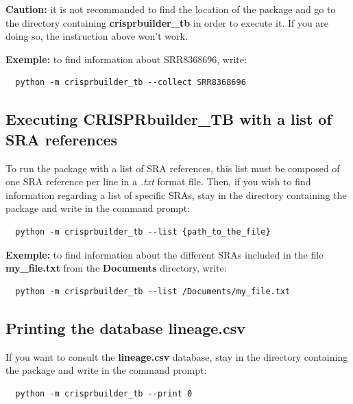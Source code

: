 \documentclass[twoside,a4paper,11pt,frenchb,openany]{report}
\begin{document}
\textbf{Caution:} it is not recommanded to find the location of the
package and go to the directory containing \textbf{crisprbuilder\_tb} in order to
execute it. If you are doing so, the instruction above won't work.

    \textbf{Exemple:} to find information about SRR8368696, write:

    \begin{verbatim}
  python -m crisprbuilder_tb --collect SRR8368696
\end{verbatim}


    \subsection{Executing CRISPRbuilder\_TB with a list of SRA
references}\label{executing-crisprbuilder_tb-with-a-list-of-sra-references}

    To run the package with a list of SRA references, this list must be
composed of one SRA reference per line in a \textit{.txt} format file. Then, if
you wish to find information regarding a list of specific SRAs, stay in
the directory containing the package and write in the command prompt:

    \begin{verbatim}
  python -m crisprbuilder_tb --list {path_to_the_file}
\end{verbatim}

    \textbf{Exemple:} to find information about the different SRAs included
in the file \textbf{my\_file.txt} from the \textbf{Documents} directory,
write:

    \begin{verbatim}
  python -m crisprbuilder_tb --list /Documents/my_file.txt
\end{verbatim}



    \subsection{Printing the database
lineage.csv}\label{printing-the-database-lineage.csv}

    If you want to consult the \textbf{lineage.csv} database, stay in the
directory containing the package and write in the command prompt:

    \begin{verbatim}
  python -m crisprbuilder_tb --print 0
\end{verbatim}
\end{document}
